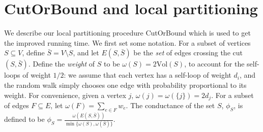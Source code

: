 \documentclass[11pt]{article}
\newcommand\CutOrBound{{\sc CutOrBound}\xspace}
\newcommand\volls{\omega}
\def\vol{\text{Vol}}
\begin{document}
\section{\CutOrBound and local partitioning}
\def\ptil{\tilde{p}}
\def\Itil{\tilde{I}}
\def\Stil{\tilde{S}}
We describe our local partitioning procedure
{\CutOrBound} which is used to get the improved
running time. We first set some notation.
For a subset of vertices $S \subseteq V$, define $\bar{S} = V \setminus S$, and let $E(S, \bar{S})$ be the \emph{set} of edges crossing the cut $(S, \bar{S})$. Define the {\em weight} of $S$ to be $\volls(S) = 2\vol(S)$, to account for the self-loops of weight $1/2$: we assume that each vertex has a self-loop of weight
$d_i$, and the random walk simply chooses one edge with probability
proportional to its weight. For convenience, given a vertex $j$, $\volls(j) = \volls(\{j\}) = 2d_j$.
For a subset of edges $F \subseteq E$, let $\volls(F) = \sum_{e \in F} w_e$. The conductance of the set
$S$, $\phi_S$, is defined to be
$\phi_S = \frac{\volls(E(S, \bar{S}))}{\min\{\volls(S), \volls(\bar{S})\}}$.
\end{document}
